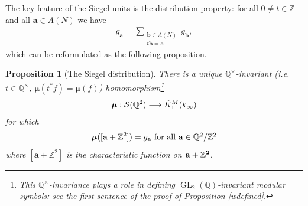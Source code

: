 \documentclass[12pt,amstex,amssymb]{article}
\theoremstyle{plain}
\newtheorem{proposition}[theorem]{Proposition}
\theoremstyle{definition}
\def\lra{\longrightarrow}
\def\cR{{\cal R}}
\def\cS{{\cal S}}
\def\fH{{\frak H}}
\def\Z{{\mathbb Z}}
\def\A{{\mathbb A}}
\def\Q{{\mathbb Q}}
\newcommand{\be}{\begin{eqnarray*}}
\newcommand{\ee}{\end{eqnarray*}}
\newcommand{\bea}{\begin{eqnarray}}
\newcommand{\eea}{\end{eqnarray}}
\newcommand{\GL}{\operatorname{GL}}
\newcommand{\ba}{\mathbf{a}}
\newcommand{\bb}{\mathbf{b}}
\newcommand{\Dist}{\operatorname{Dist}}
\begin{document}
The key feature of the Siegel units is the distribution property:
for all $0\neq t \in \Z$ and all $\ba \in A(N)$ we have
\be
g_\ba= \sum_{\substack{\bb \in A(N)\\ t \bb=\ba}} g_\bb,
\ee
which can be reformulated as the following proposition.
\begin{proposition}[The Siegel distribution]\cite[Theorem 1.8]{Colmez}\label{Sieg}
There is a unique $\Q^\times$-invariant (i.e. $t \in \Q^\times$, $\bm\mu(t^* f)=\bm\mu(f)$) homomorphism\footnote{This $\Q^\times$-invariance plays a role in defining $\GL_2(\Q)$-invariant modular symbols: see the first sentence of the proof of Proposition \ref{wdefined}.}
$$
{\bm\mu} : \cS(\Q^2) \lra \tilde K^M_1(k_\infty) 
$$
for which 
$$
{\bm\mu}([\ba+\Z^2]) = g_{\ba}\ \hbox{\rm for all ${\bf a}\in \Q^2/\Z^2$}
$$
where $[\ba+\Z^2]$ is the characteristic function on $\bf a +\Z^2$.
\end{proposition}




\end{document}
